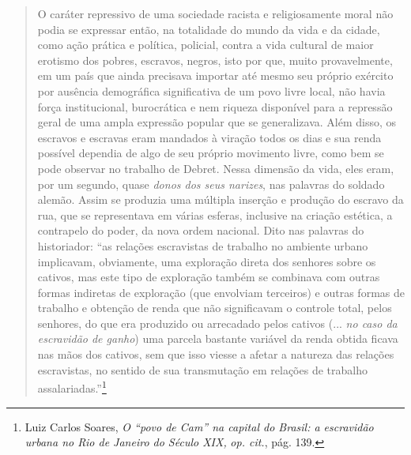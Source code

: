 \begin{quote}
O caráter repressivo de uma sociedade racista e religiosamente moral não
podia se expressar então, na totalidade do mundo da vida e da cidade,
como ação prática e política, policial, contra a vida cultural de maior
erotismo dos pobres, escravos, negros, isto por que, muito
provavelmente, em um país que ainda precisava importar até mesmo seu
próprio exército por ausência demográfica significativa de um povo livre
local, não havia força institucional, burocrática e nem riqueza
disponível para a repressão geral de uma ampla expressão popular que se
generalizava. Além disso, os escravos e escravas eram mandados à viração
todos os dias e sua renda possível dependia de algo de seu próprio
movimento livre, como bem se pode observar no trabalho de Debret. Nessa
dimensão da vida, eles eram, por um segundo, quase \emph{donos dos seus
narizes}, nas palavras do soldado alemão. Assim se produzia uma múltipla
inserção e produção do escravo da rua, que se representava em várias
esferas, inclusive na criação estética, a contrapelo do poder, da nova
ordem nacional. Dito nas palavras do historiador: ``as relações
escravistas de trabalho no ambiente urbano implicavam, obviamente, uma
exploração direta dos senhores sobre os cativos, mas este tipo de
exploração também se combinava com outras formas indiretas de exploração
(que envolviam terceiros) e outras formas de trabalho e obtenção de
renda que não significavam o controle total, pelos senhores, do que era
produzido ou arrecadado pelos cativos (... \emph{no caso da escravidão
de ganho}) uma parcela bastante variável da renda obtida ficava nas mãos
dos cativos, sem que isso viesse a afetar a natureza das relações
escravistas, no sentido de sua transmutação em relações de trabalho
assalariadas.''\footnote{Luiz Carlos Soares, \emph{O ``povo de Cam'' na
  capital do Brasil: a escravidão urbana no Rio de Janeiro do Século
  XIX,} \emph{op. cit.}, pág. 139.}


\end{quote}
